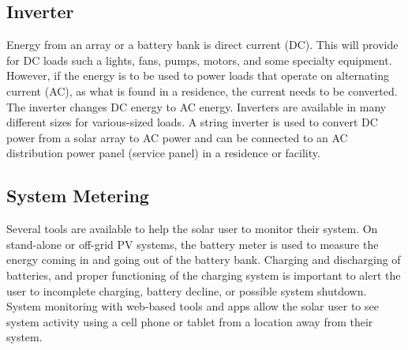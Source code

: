 
\subsection{Inverter}
Energy from an array or a battery bank is direct current
(DC). This will provide for DC loads such a lights, fans,
pumps, motors, and some specialty equipment. However,
if the energy is to be used to power loads that operate on
alternating current (AC), as what is found in a residence, the
current needs to be converted. The inverter changes DC energy
to AC energy. Inverters are available in many different sizes
for various-sized loads. 
A string inverter is used to convert DC power from a solar
array to AC power and can be connected to an AC distribution
power panel (service panel) in a residence or facility.


\subsection{System Metering}
Several tools are available to help the solar user to monitor
their system. On stand-alone or off-grid PV systems, the
battery meter is used to measure the energy coming in and
going out of the battery bank. Charging and discharging of
batteries, and proper functioning of the charging system is
important to alert the user to incomplete charging, battery
decline, or possible system shutdown. System monitoring
with web-based tools and apps allow the solar user to see
system activity using a cell phone or tablet from a location
away from their system.
